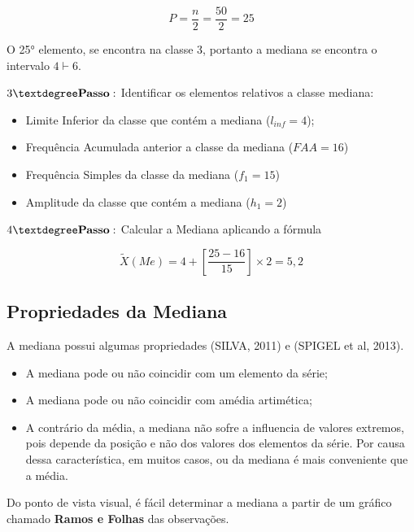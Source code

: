 $$ P=\frac{n}{2}=\frac{50}{2}=25 $$

O 25° elemento, se encontra na classe 3, portanto a mediana se encontra o intervalo $ 4 \vdash 6$.

\vskip0.3cm

$3° \mbox{\textbf{Passo}}:$ Identificar os elementos relativos a classe mediana:

\begin{itemize}
  \item Limite Inferior da classe que contém a mediana ($l_{inf}=4$);
  \item Frequência Acumulada anterior a classe da mediana ($FAA=16$)
  \item Frequência Simples da classe da mediana ($f_{1}=15$)
  \item Amplitude da classe que contém a mediana ($h_{1}=2$)
\end{itemize}

$4° \mbox{\textbf{Passo}}:$ Calcular a Mediana aplicando a fórmula


\begin{equation}\label{}
    \tilde{X}(Me)= 4+\left[\frac{25-16}{15}\right]\times 2 = 5,2
\end{equation}








\subsection{Propriedades da Mediana}

A mediana possui algumas propriedades (SILVA, 2011) e (SPIGEL et al, 2013).

\begin{itemize}
\item A mediana pode ou não coincidir com um elemento da série;
\item A mediana pode ou não coincidir com amédia artimética;
\item A contrário da média, a mediana não sofre a influencia de valores extremos, pois depende da posição e não dos valores dos elementos da série. Por causa dessa característica, em muitos casos, ou da mediana é mais conveniente que a média.    
\end{itemize}


Do ponto de vista visual, é fácil determinar a mediana a partir de um gráfico chamado \textbf{Ramos e Folhas} das observações.




